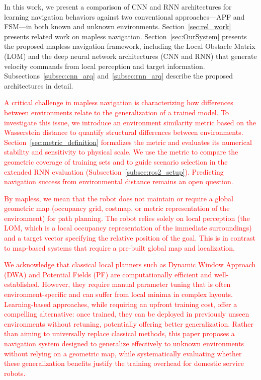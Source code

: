 \documentclass[robotics,article,submit,pdftex,moreauthors]{Definitions/mdpi}
\begin{document}
In this work, we present a comparison of CNN and RNN architectures for learning navigation behaviors against two conventional approaches—APF and FSM—in both known and unknown environments. Section~\ref{sec:rel_work} presents related work on mapless navigation. Section~\ref{sec:OurSystem} presents the proposed mapless navigation framework, including the Local Obstacle Matrix (LOM) and the deep neural network architectures (CNN and RNN) that generate velocity commands from local perception and target information. Subsections~\ref{subsec:cnn_arq} and~\ref{subsec:rnn_arq} describe the proposed architectures in detail.

\textcolor{red}{A critical challenge in mapless navigation is characterizing how differences between environments relate to the generalization of a trained model. To investigate this issue, we introduce an environment similarity metric based on the Wasserstein distance to quantify structural differences between environments. Section~\ref{sec:metric_definition} formalizes the metric and evaluates its numerical stability and sensitivity to physical scale. We use the metric to compare the geometric coverage of training sets and to guide scenario selection in the extended RNN evaluation (Subsection~\ref{subsec:ros2_setup}). Predicting navigation success from environmental distance remains an open question.}

\textcolor{red}{By mapless, we mean that the robot does not maintain or require a global geometric map (occupancy grid, costmap, or metric representation of the environment) for path planning. The robot relies solely on local perception (the LOM, which is a local occupancy representation of the immediate surroundings) and a target vector specifying the relative position of the goal. This is in contrast to map-based systems that require a pre-built global map and localization.}

\textcolor{red}{We acknowledge that classical local planners such as Dynamic Window Approach (DWA) and Potential Fields (PF) are computationally efficient and well-established. However, they require manual parameter tuning that is often environment-specific and can suffer from local minima in complex layouts. Learning-based approaches, while requiring an upfront training cost, offer a compelling alternative: once trained, they can be deployed in previously unseen environments without retuning, potentially offering better generalization. Rather than aiming to universally replace classical methods, this paper proposes a navigation system designed to generalize effectively to unknown environments without relying on a geometric map, while systematically evaluating whether these generalization benefits justify the training overhead for domestic service robots.}
\end{document}
